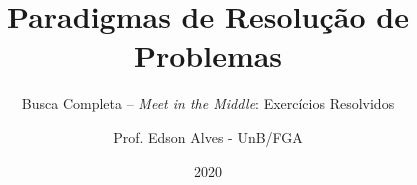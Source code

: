 \title{Paradigmas de Resolução de Problemas}
\subtitle{Busca Completa -- {\it Meet in the Middle}: Exercícios Resolvidos}
\author{Prof. Edson Alves - UnB/FGA}
\date{2020}
